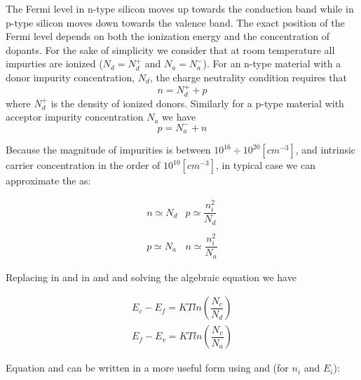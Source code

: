 The Fermi level in n-type silicon moves up towards the conduction band while in p-type silicon moves down towards the valence band.
The exact position of the Fermi level depends on both the ionization energy and the concentration of dopants. For the sake of simplicity we consider that at room temperature all impurties are ionized ($N_d = N_d^+$ and $N_a = N_a^-$).  For an n-type material with a donor impurity concentration, $N_d$, the charge neutrality condition requires that
\begin{equation}
\label{eq: equilibrium charge in n-type}
n = N_d^+ + p
\end{equation}
 where $N_d^+$ is the density of ionized donors.  Similarly for a p-type material with acceptor impurity concentration $N_a$ we have
\begin{equation}
\label{eq: equilibrium charge in p-type}
p = N_a^- + n
\end{equation}
 
 Because the magnitude of impurities is between $10^{16}\div 10^{20} [cm^{-3}]$, and intrinsic carrier concentration in the order of $10^{10}[cm^{-3}]$, in typical case we can approximate the  as:
  
\begin{equation}
\label{eq: equilibiurm approximation}
\begin{array}{ll}
n \simeq N_d & p \simeq \dfrac{n_i^2}{N_d} \\ \\
p \simeq N_a & n \simeq \dfrac{n_i^2}{N_a}
\end{array}
\end{equation}

Replacing  in   and  in  and  and solving the algebraic equation we have
 
 \begin{align}
 E_c-E_f = KTln\left(\dfrac{N_c}{N_d}\right)  \label{eq: Ef in n-type}\\
 E_f-E_v= KTln\left(\dfrac{N_v}{N_a}\right) \label{eq: Ef in p-type}
 \end{align}

Equation  and  can be written in a more useful form using  and  (for $n_i$ and $E_i$):


